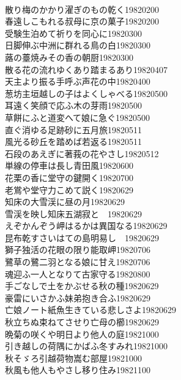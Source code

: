 \begin{multicols}{2}
\\散り梅のかかり濯ぎのもの乾く\hfill{19820200}
\\春遠しこもれる叔母に京の菓子\hfill{19820200}
\\受験生泊めて祈りを同心に\hfill{19820300}
\\日脚伸ぶ中洲に群れる鳥の白\hfill{19820300}
\\蕗の薹焼みその香の朝厨\hfill{19820300}
\\散る花の流れゆくあり踏まるあり\hfill{19820407}
\\天主より振る手呼ぶ声花の中\hfill{19820400}
\\葱坊主垣越しの子はよくしゃべる\hfill{19820500}
\\耳遠く笑顔で応ふ木の芽雨\hfill{19820500}
\\草餅にふと道変へて娘に急ぐ\hfill{19820500}
\\直ぐ消ゆる足跡砂に五月旅\hfill{19820511}
\\風光る砂丘を踏めば若返る\hfill{19820511}
\\石段のあえぎに著莪の花やさし\hfill{19820512}
\\単線の停車は長し青田風\hfill{19820600}
\\花栗の香に堂守の鍵開く\hfill{19820700}
\\老鴬や堂守力こめて説く\hfill{19820629}
\\知床の大雪渓に昼の月\hfill{19820629}
\\雪渓を映し知床五湖寂と　\hfill{19820629}
\\えぞかんぞう岬はるかは異国なる\hfill{19820629}
\\昆布乾すさいはての島明易し　\hfill{19820629}
\\獅子独活の花眼の限り能取岬\hfill{19820706}
\\鷺草の鷺二羽となる娘に甘え\hfill{19820706}
\\魂迎ふ一人となりて古家守る\hfill{19820800}
\\手ごなしで土をかぶせる秋の種\hfill{19820629}
\\豪雷にいさかふ妹弟抱き合ふ\hfill{19820629}
\\亡娘ノート紙魚生きている悲しさよ\hfill{19820629}
\\秋立ちぬ束ねてさせり亡母の櫛\hfill{19820629}
\\晩菊の咲くや明日より他人の庭\hfill{19821000}
\\引き越しの荷隅にかばふ冬すみれ\hfill{19821000}
\\秋そゞろ引越荷物嵩む部屋\hfill{19821000}
\\秋風も他人もやさし移り住み\hfill{19821100}

\end{multicols}
